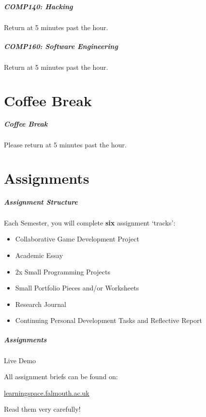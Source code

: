 \begin{frame}
	\frametitle{COMP140: Hacking}
	
	Return at 5 minutes past the hour.

\end{frame}

\begin{frame}
	\frametitle{COMP160: Software Engineering}
	
	Return at 5 minutes past the hour.

\end{frame}

\part{Coffee Break}
\frame{\partpage}

\begin{frame}
	\frametitle{Coffee Break}
	
	Please return at 5 minutes past the hour.

\end{frame}

\part{Assignments}
\frame{\partpage}

\begin{frame}
	\frametitle{Assignment Structure}
	
	Each Semester, you will complete \textbf{six} assignment `tracks':
	
	\begin{itemize}
		\item Collaborative Game Development Project
		\item Academic Essay
		\item 2x Small Programming Projects
		\item Small Portfolio Pieces and/or Worksheets
		\item Research Journal
		\item Continuing Personal Development Tasks and Reflective Report
	\end{itemize}

\end{frame}

\begin{frame}
	\frametitle{Assignments}
	
	Live Demo
	
	\vspace{3em}
	
	All assignment briefs can be found on:
	
	\vspace{0.5em}
	
	\indent \url{learningspace.falmouth.ac.uk}
	
	\vspace{0.5em}
	
	Read them very carefully!
	
\end{frame}


